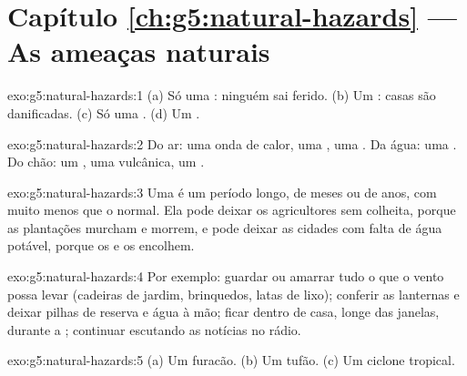 \section*{Capítulo \ref{ch:g5:natural-hazards} --- As ameaças naturais}

\begin{solution}{exo:g5:natural-hazards:1}
(a) Só uma : ninguém sai ferido. (b) Um :
casas são danificadas. (c) Só uma . (d) Um .
\end{solution}

\begin{solution}{exo:g5:natural-hazards:2}
Do ar: uma onda de calor, uma , uma . Da água: uma
. Do chão: um , uma  vulcânica, um
.
\end{solution}

\begin{solution}{exo:g5:natural-hazards:3}
Uma  é um período longo, de meses ou de anos, com muito menos  que
o normal. Ela pode deixar os agricultores sem colheita, porque as
plantações murcham e morrem, e pode deixar as cidades com falta de água
potável, porque os  e os  encolhem.
\end{solution}

\begin{solution}{exo:g5:natural-hazards:4}
Por exemplo: guardar ou amarrar tudo o que o vento possa levar (cadeiras
de jardim, brinquedos, latas de lixo); conferir as lanternas e deixar
pilhas de reserva e água à mão; ficar dentro de casa, longe das janelas,
durante a ; continuar escutando as notícias no rádio.
\end{solution}

\begin{solution}{exo:g5:natural-hazards:5}
(a) Um furacão. (b) Um tufão. (c) Um ciclone tropical.
\end{solution}


